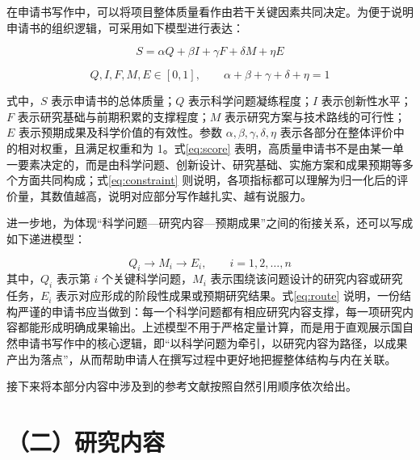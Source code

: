 \documentclass[12pt,UTF8,AutoFakeBold=2,a4paper]{ctexart}
\begin{document}
	在申请书写作中，可以将项目整体质量看作由若干关键因素共同决定。为便于说明申请书的组织逻辑，可采用如下模型进行表达：
	
	\begin{equation}
		\label{eq:score}
		S = \alpha Q + \beta I + \gamma F + \delta M + \eta E
	\end{equation}
	
	\begin{equation}
		\label{eq:constraint}
		Q, I, F, M, E \in [0,1], \qquad
		\alpha + \beta + \gamma + \delta + \eta = 1
	\end{equation}
	
	式中，$S$ 表示申请书的总体质量；$Q$ 表示科学问题凝练程度；$I$ 表示创新性水平；$F$ 表示研究基础与前期积累的支撑程度；$M$ 表示研究方案与技术路线的可行性；$E$ 表示预期成果及科学价值的有效性。参数 $\alpha,\beta,\gamma,\delta,\eta$ 表示各部分在整体评价中的相对权重，且满足权重和为 1。式\eqref{eq:score} 表明，高质量申请书不是由某一单一要素决定的，而是由科学问题、创新设计、研究基础、实施方案和成果预期等多个方面共同构成；式\eqref{eq:constraint} 则说明，各项指标都可以理解为归一化后的评价量，其数值越高，说明对应部分写作越扎实、越有说服力。
	
	进一步地，为体现“科学问题—研究内容—预期成果”之间的衔接关系，还可以写成如下递进模型：
	
	\begin{equation}
		\label{eq:route}
		Q_i \rightarrow M_i \rightarrow E_i,\qquad i=1,2,\ldots,n
	\end{equation}
	其中，$Q_i$ 表示第 $i$ 个关键科学问题，$M_i$ 表示围绕该问题设计的研究内容或研究任务，$E_i$ 表示对应形成的阶段性成果或预期研究结果。式\eqref{eq:route} 说明，一份结构严谨的申请书应当做到：每一个科学问题都有相应研究内容支撑，每一项研究内容都能形成明确成果输出。上述模型不用于严格定量计算，而是用于直观展示国自然申请书写作中的核心逻辑，即“以科学问题为牵引，以研究内容为路径，以成果产出为落点”，从而帮助申请人在撰写过程中更好地把握整体结构与内在关联。
	
	接下来将本部分内容中涉及到的参考文献按照自然引用顺序依次给出。
	
	\NSFCPrintBibliography
	
	\section{（二）研究内容}
	\NSFCGuideText{\NSFCSectionTwoGuide}
	
\end{document}
